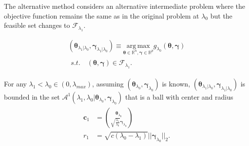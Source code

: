 The alternative method considers an alternative intermediate problem where the objective function remains the same as in the original problem at $\lambda_0$ but the feasible set changes to $\mathcal{F}_{\lambda_1}$.

\begin{gather}
        \label{eq:dualmialt}
        (\boldsymbol\theta_{\lambda_1|\lambda_0},\boldsymbol\gamma_{\lambda_1|\lambda_0})\equiv\underset{\boldsymbol\theta\in \mathbb{R}^{ n},\boldsymbol\gamma\in\mathbb{R}^p}{\mathrm{arg\,max}}g_{\lambda_0}(\boldsymbol\theta,\boldsymbol\gamma)\\
        \begin{aligned}s.t.\quad (\boldsymbol\theta,\boldsymbol\gamma)\in \mathcal{F}_{\lambda_1}\nonumber.
        \end{aligned}
\end{gather}

\begin{theorem}
    \label{thm:1.1.alt}
    For any $\lambda_1<\lambda_{0}\in (0,\lambda_{max})$, assuming $(\boldsymbol\theta_{\lambda_0},\boldsymbol\gamma_{\lambda_0})$ is known, $(\boldsymbol\theta_{\lambda_1|\lambda_0},\boldsymbol\gamma_{\lambda_1|\lambda_0})$ is bounded in the set $\mathcal{A}^1(\lambda_1,\lambda_0|\boldsymbol\theta_{\lambda_0},\boldsymbol\gamma_{\lambda_0})$ that is a ball with center and radius
    \begin{gather}
        \begin{aligned}
            \boldsymbol c_1&=\binom{\boldsymbol\theta_{\lambda_0}}{\sqrt{\frac{\lambda_1}{\lambda_0}}\boldsymbol\gamma_{\lambda_0}}\\
            r_1&=\sqrt{c(\lambda_0-\lambda_1)}||\boldsymbol\gamma_{\lambda_0}||_2.
        \end{aligned}
    \end{gather}
\end{theorem}

